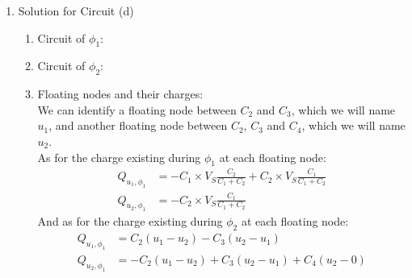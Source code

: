 {\begin{enumerate}
{\begin{enumerate}
{                }
            \end{enumerate}
        }
        \item {
            Solution for Circuit (d) \\
            \begin{center}
                
            \end{center}
            \begin{enumerate}
                \item[1.] {
                    Circuit of $\phi_1$:
                    \begin{center}
                        
                    \end{center}
                }
                \item[2.] {
                    Circuit of $\phi_2$:
                    \begin{center}
                        
                    \end{center}
                }
                \item[3.] {
                    Floating nodes and their charges: \\
                    We can identify a floating node between $C_2$ and $C_3$, which we will name $u_1$, and another floating node between $C_2$, $C_3$ and $C_4$, which we will name $u_2$. \\
                    As for the charge existing during $\phi_1$ at each floating node:
                    \begin{align*}
                        Q_{u_1, \phi_1} &= - C_1 \times V_S \frac{C_2}{C_1 + C_2} + C_2 \times V_S \frac{C_1}{C_1 + C_2} \\
                        Q_{u_2, \phi_1} &= - C_2 \times V_S \frac{C_1}{C_1 + C_2}
                    \end{align*}
                    And as for the charge existing during $\phi_2$ at each floating node:
                    \begin{align*}
                        Q_{u_1, \phi_1} &= C_2 (u_1 - u_2) - C_3 (u_2 - u_1) \\
                        Q_{u_2, \phi_1} &= - C_2 (u_1 - u_2) + C_3 (u_2 - u_1) + C_4 (u_2 - 0)
                    \end{align*}
                    
}
\end{enumerate}}
\end{enumerate}}
